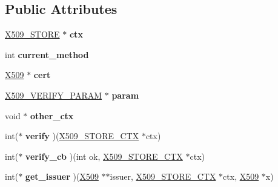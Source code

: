 \subsection*{Public Attributes}
\begin{DoxyCompactItemize}
\item 
\mbox{\label{structx509__store__ctx__st_ac633a0b046f10408d0becf0f1732ede5}} 
\hyperlink{structx509__store__st}{X509\+\_\+\+S\+T\+O\+RE} $\ast$ {\bfseries ctx}
\item 
\mbox{\label{structx509__store__ctx__st_a1bbea1b86bcb3d3f1a7d0bb05e67e860}} 
int {\bfseries current\+\_\+method}
\item 
\mbox{\label{structx509__store__ctx__st_aaf9dd5eda06f69f1a8b9f7606ee5c9b1}} 
\hyperlink{structx509__st}{X509} $\ast$ {\bfseries cert}
\item 
\mbox{\label{structx509__store__ctx__st_aacc66808b8d950db3d83395fdcd985b4}} 
\hyperlink{struct_x509___v_e_r_i_f_y___p_a_r_a_m__st}{X509\+\_\+\+V\+E\+R\+I\+F\+Y\+\_\+\+P\+A\+R\+AM} $\ast$ {\bfseries param}
\item 
\mbox{\label{structx509__store__ctx__st_ab5ca1f66ed3e28f30ec7dc4df63ae78d}} 
void $\ast$ {\bfseries other\+\_\+ctx}
\item 
\mbox{\label{structx509__store__ctx__st_a40f028b2c848dc8df554ab89ac562fd1}} 
int($\ast$ {\bfseries verify} )(\hyperlink{structx509__store__ctx__st}{X509\+\_\+\+S\+T\+O\+R\+E\+\_\+\+C\+TX} $\ast$ctx)
\item 
\mbox{\label{structx509__store__ctx__st_a07d959e3a0cb959ec7c39bd7b8ee76eb}} 
int($\ast$ {\bfseries verify\+\_\+cb} )(int ok, \hyperlink{structx509__store__ctx__st}{X509\+\_\+\+S\+T\+O\+R\+E\+\_\+\+C\+TX} $\ast$ctx)
\item 
\mbox{\label{structx509__store__ctx__st_a5374f462a245a61de3aa7a7ccf18ddb9}} 
int($\ast$ {\bfseries get\+\_\+issuer} )(\hyperlink{structx509__st}{X509} $\ast$$\ast$issuer, \hyperlink{structx509__store__ctx__st}{X509\+\_\+\+S\+T\+O\+R\+E\+\_\+\+C\+TX} $\ast$ctx, \hyperlink{structx509__st}{X509} $\ast$x)
$$
\end{DoxyCompactItemize}
